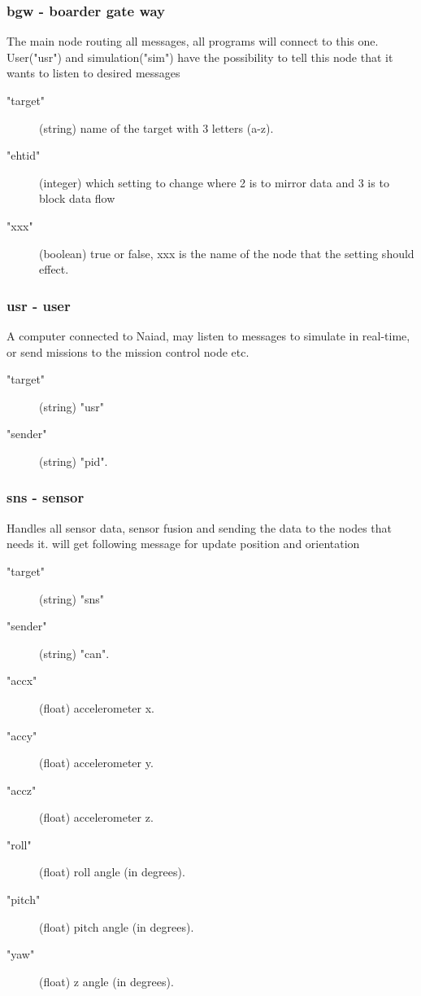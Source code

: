 \noindent 

\subsubsection{bgw - boarder gate way}
The main node routing all messages, all programs will connect to this one. User("usr") and simulation("sim") have the possibility to tell this node that it wants to listen to desired messages
\begin{description}
  \item["target"] (string) name of the target with 3 letters (a-z).
  \item["ehtid"] (integer) which setting to change where 2 is to mirror data and 3 is to block data flow
  \item["xxx"] (boolean) true or false, xxx is the name of the node that the setting should effect.
\end{description}

\subsubsection{usr - user}
A computer connected to Naiad, may listen to messages to simulate in real-time, or send missions to the mission control node etc.
\begin{description}
  \item["target"] (string) "usr"
  \item["sender"] (string) "pid".
\end{description}

\subsubsection{sns - sensor}
Handles all sensor data, sensor fusion and sending the data to the nodes that needs it.
will get following message for update position and orientation
\begin{description}
  \item["target"] (string) "sns"
  \item["sender"] (string) "can".
  \item["accx"] (float) accelerometer x.
  \item["accy"] (float) accelerometer y.
  \item["accz"] (float) accelerometer z.
  \item["roll"] (float) roll angle (in degrees).
  \item["pitch"] (float) pitch angle (in degrees).
  \item["yaw"] (float) z angle (in degrees).
\end{description}

